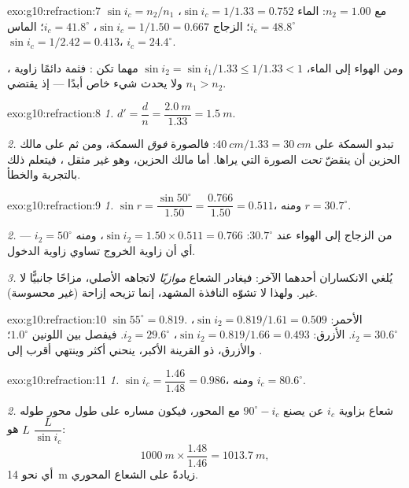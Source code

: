\begin{solution}{exo:g10:refraction:7}
$\sin i_c = n_2/n_1$ مع $n_2 = 1.00$:
الماء $\sin i_c = 1/1.33 = 0.752$، $i_c = 48.8^\circ$؛
الزجاج $\sin i_c = 1/1.50 = 0.667$، $i_c = 41.8^\circ$؛
الماس $\sin i_c = 1/2.42 = 0.413$، $i_c = 24.4^\circ$.

ومن الهواء إلى الماء، $\sin i_2 = \sin i_1/1.33 \leq 1/1.33 < 1$ مهما تكن
: فثمة دائمًا زاوية ، ولا يحدث شيء
خاص أبدًا --- إذ يقتضي  $n_1 > n_2$.
\end{solution}

\begin{solution}{exo:g10:refraction:8}
\emph{1.} $d' = \dfrac{d}{n} = \dfrac{\qty{2.0}{m}}{1.33}
= \qty{1.5}{m}$.

\emph{2.} تبدو السمكة على $\qty{40}{cm}/1.33 = \qty{30}{cm}$: فالصورة
\emph{فوق} السمكة، ومن ثم على مالك الحزين أن ينقضّ \emph{تحت}
الصورة التي يراها. أما مالك الحزين، وهو غير مثقل ، فيتعلم ذلك
بالتجربة والخطأ.
\end{solution}

\begin{solution}{exo:g10:refraction:9}
\emph{1.} $\sin r = \dfrac{\sin 50^\circ}{1.50} = \dfrac{0.766}{1.50}
= 0.511$، ومنه $r = 30.7^\circ$.

\emph{2.} من الزجاج إلى الهواء عند $30.7^\circ$:
$\sin i_2 = 1.50 \times 0.511 = 0.766$، ومنه $i_2 = 50^\circ$ --- أي أن
زاوية الخروج تساوي زاوية الدخول.

\emph{3.} يُلغي الانكساران أحدهما الآخر: فيغادر الشعاع
\emph{موازيًا} لاتجاهه الأصلي، مزاحًا جانبيًّا لا غير.
ولهذا لا تشوّه النافذة المشهد، إنما تزيحه إزاحة
(غير محسوسة).
\end{solution}

\begin{solution}{exo:g10:refraction:10}
$\sin 55^\circ = 0.819$. الأحمر:
$\sin i_2 = 0.819/1.61 = 0.509$، $i_2 = 30.6^\circ$. الأزرق:
$\sin i_2 = 0.819/1.66 = 0.493$، $i_2 = 29.6^\circ$. فيفصل بين اللونين
$1.0^\circ$؛ والأزرق، ذو القرينة الأكبر، ينحني أكثر
وينتهي أقرب إلى .
\end{solution}

\begin{solution}{exo:g10:refraction:11}
\emph{1.} $\sin i_c = \dfrac{1.46}{1.48} = 0.986$، ومنه
$i_c = 80.6^\circ$.

\emph{2.} شعاع بزاوية $i_c$ عن  يصنع $90^\circ - i_c$ مع
المحور، فيكون مساره على طول محور طوله $L$ هو $\dfrac{L}{\sin i_c}$:
\[
\qty{1000}{m} \times \frac{1.48}{1.46} = \qty{1013.7}{m},
\]
أي نحو \qty{14}{m} زيادةً على الشعاع المحوري.
\end{solution}

